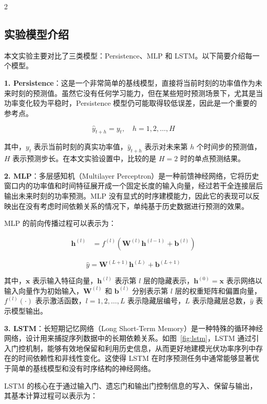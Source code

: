 \begin{multicols}{2}
\subsection{实验模型介绍}

本文实验主要对比了三类模型：Persistence、MLP 和 LSTM。以下简要介绍每一个模型。

\textbf{1. Persistence}：这是一个非常简单的基线模型，直接将当前时刻的功率值作为未来时刻的预测值。虽然它没有任何学习能力，但在某些短时预测场景下，尤其是当功率变化较为平稳时，Persistence 模型仍可能取得较低误差，因此是一个重要的参考点。

\[
\hat{y}_{t+h}=y_t,\quad h=1,2,\dots,H
\]

其中，$y_t$ 表示当前时刻的真实功率值，$\hat{y}_{t+h}$ 表示对未来第 $h$ 个时间步的预测值，$H$ 表示预测步长。在本文实验设置中，比较的是 $H=2$ 时的单点预测结果。



\textbf{2. MLP}：多层感知机（Multilayer Perceptron）是一种前馈神经网络，它将历史窗口内的功率值和时间特征展开成一个固定长度的输入向量，经过若干全连接层后输出未来时刻的功率预测。MLP 没有显式的时序建模能力，因此它的表现可以反映出在没有考虑时间依赖关系的情况下，单纯基于历史数据进行预测的效果。

MLP 的前向传播过程可以表示为：

\[
\begin{aligned}
\mathbf{h}^{(l)} &= f^{(l)}\left(\mathbf{W}^{(l)}\mathbf{h}^{(l-1)} + \mathbf{b}^{(l)}\right)
\end{aligned}
\]

\[
\hat{y}=\mathbf{W}^{(L+1)}\mathbf{h}^{(L)}+\mathbf{b}^{(L+1)}
\]

其中，$\mathbf{x}$ 表示输入特征向量，$\mathbf{h}^{(l)}$ 表示第 $l$ 层的隐藏表示，$\mathbf{h}^{(0)}=\mathbf{x}$ 表示网络以输入向量作为初始输入，$\mathbf{W}^{(l)}$ 和 $\mathbf{b}^{(l)}$ 分别表示第 $l$ 层的权重矩阵和偏置向量，$f^{(l)}(\cdot)$ 表示激活函数，$l=1,2,\dots,L$ 表示隐藏层编号，$L$ 表示隐藏层总数，$\hat{y}$ 表示模型输出。

\textbf{3. LSTM}：长短期记忆网络（Long Short-Term Memory）是一种特殊的循环神经网络，设计用来捕捉序列数据中的长期依赖关系。如图~\ref{fig:lstm}，LSTM 通过引入门控机制，能够有效地保留和利用历史信息，从而更好地建模光伏功率序列中存在的时间依赖性和非线性变化。这使得 LSTM 在时序预测任务中通常能够显著优于简单的基线模型和没有时序结构的神经网络。

LSTM 的核心在于通过输入门、遗忘门和输出门控制信息的写入、保留与输出，其基本计算过程可以表示为：


\end{multicols}
